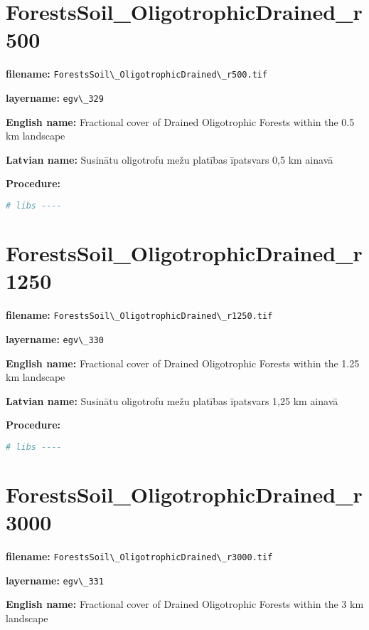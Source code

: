 \documentclass[
]{book}
\newcommand{\passthrough}[1]{#1}
\begin{document}
\section{ForestsSoil\_OligotrophicDrained\_r500}\label{ch06.329}

\textbf{filename:} \passthrough{\lstinline!ForestsSoil\_OligotrophicDrained\_r500.tif!}

\textbf{layername:} \passthrough{\lstinline!egv\_329!}

\textbf{English name:} Fractional cover of Drained Oligotrophic Forests within the 0.5 km landscape

\textbf{Latvian name:} Susinātu oligotrofu mežu platības īpatsvars 0,5 km ainavā

\textbf{Procedure:}

\begin{lstlisting}[language=R]
# libs ----
\end{lstlisting}

\section{ForestsSoil\_OligotrophicDrained\_r1250}\label{ch06.330}

\textbf{filename:} \passthrough{\lstinline!ForestsSoil\_OligotrophicDrained\_r1250.tif!}

\textbf{layername:} \passthrough{\lstinline!egv\_330!}

\textbf{English name:} Fractional cover of Drained Oligotrophic Forests within the 1.25 km landscape

\textbf{Latvian name:} Susinātu oligotrofu mežu platības īpatsvars 1,25 km ainavā

\textbf{Procedure:}

\begin{lstlisting}[language=R]
# libs ----
\end{lstlisting}

\section{ForestsSoil\_OligotrophicDrained\_r3000}\label{ch06.331}

\textbf{filename:} \passthrough{\lstinline!ForestsSoil\_OligotrophicDrained\_r3000.tif!}

\textbf{layername:} \passthrough{\lstinline!egv\_331!}

\textbf{English name:} Fractional cover of Drained Oligotrophic Forests within the 3 km landscape
\end{document}
